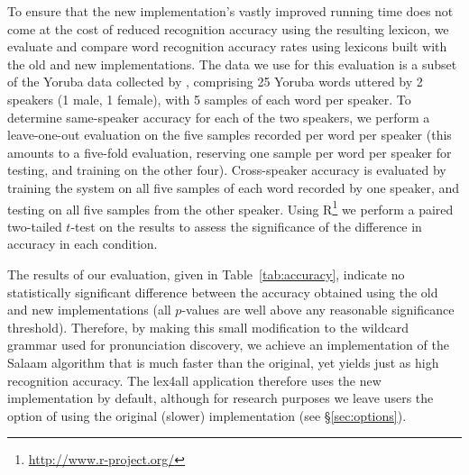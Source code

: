 \documentclass[11pt]{article}
\begin{document}
To ensure that the new implementation's vastly improved running time does not come at the cost of reduced recognition accuracy using the resulting lexicon, we evaluate and compare word recognition accuracy rates using lexicons built with the old and new implementations. The data we use for this evaluation is a subset of the Yoruba data collected by , comprising 25 Yoruba words uttered by 2 speakers (1 male, 1 female), with 5 samples of each word per speaker. 
To determine same-speaker accuracy for each of the two speakers, we perform a leave-one-out evaluation on the five samples recorded per word per speaker (this amounts to a five-fold evaluation, reserving one sample per word per speaker for testing, and training on the other four). Cross-speaker accuracy is evaluated by training the system on all five samples of each word recorded by one speaker, and testing on all five samples from the other speaker.
Using R\footnote{\url{http://www.r-project.org/}} we perform a paired two-tailed $t$-test on the results to assess the significance of the difference in accuracy in each condition.

The results of our evaluation, given in Table~\ref{tab:accuracy}, indicate no statistically significant difference between the accuracy obtained using the old and new implementations (all $p$-values are well above any reasonable significance threshold). Therefore, by making this small modification to the wildcard grammar used for pronunciation discovery, we achieve an implementation of the Salaam algorithm that is much faster than the original, yet yields just as high recognition accuracy. The lex4all application therefore uses the new implementation by default, although for research purposes we leave users the option of using the original (slower) implementation (see \S\ref{sec:options}).
\end{document}
